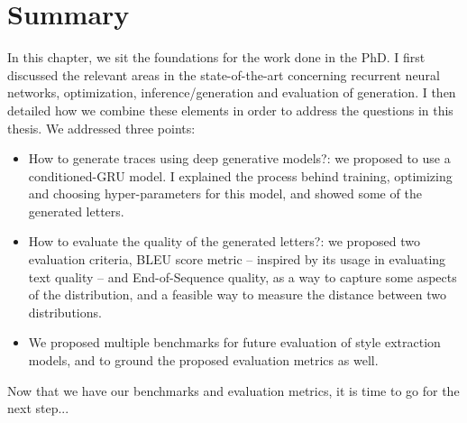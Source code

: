 \section{Summary}

\par In this chapter, we sit the foundations for the work done in the PhD. I first discussed the relevant areas in the state-of-the-art concerning recurrent neural networks, optimization, inference/generation and evaluation of generation. I then detailed how we combine these elements in order to address the questions in this thesis. We addressed three points:
\begin{itemize}
    \item How to generate traces using deep generative models?: we proposed to use a conditioned-GRU model. I explained the process behind training, optimizing and choosing hyper-parameters for this model, and showed some of the generated letters.
    \item How to evaluate the quality of the generated letters?: we proposed two evaluation criteria, BLEU score metric -- inspired by its usage in evaluating text quality -- and End-of-Sequence quality, as a way to capture some aspects of the distribution, and a feasible way to measure the distance between two distributions.
    \item We proposed multiple benchmarks for future evaluation of style extraction models, and to ground the proposed evaluation metrics as well.
\end{itemize}
Now that we have our benchmarks and evaluation metrics, it is time to go for the next step...
